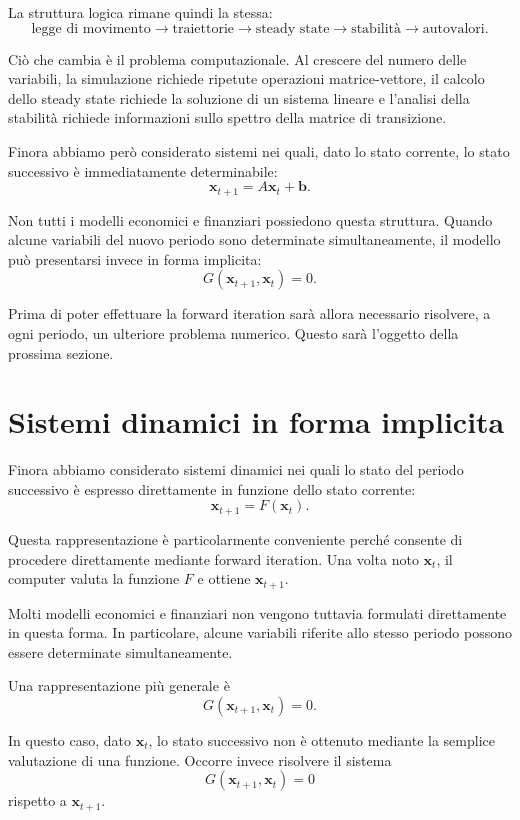 \documentclass{book}
\begin{document}
La struttura logica rimane quindi la stessa:
\[
\boxed{
\text{legge di movimento}
\longrightarrow
\text{traiettorie}
\longrightarrow
\text{steady state}
\longrightarrow
\text{stabilità}
\longrightarrow
\text{autovalori}
}.
\]

Ciò che cambia è il problema computazionale. Al crescere del numero delle
variabili, la simulazione richiede ripetute operazioni matrice-vettore,
il calcolo dello steady state richiede la soluzione di un sistema lineare
e l'analisi della stabilità richiede informazioni sullo spettro della
matrice di transizione.

Finora abbiamo però considerato sistemi nei quali, dato lo stato corrente,
lo stato successivo è immediatamente determinabile:
\[
\mathbf{x}_{t+1}
=
A\mathbf{x}_t+\mathbf{b}.
\]

Non tutti i modelli economici e finanziari possiedono questa struttura.
Quando alcune variabili del nuovo periodo sono determinate
simultaneamente, il modello può presentarsi invece in forma implicita:
\[
G(\mathbf{x}_{t+1},\mathbf{x}_t)=0.
\]

Prima di poter effettuare la forward iteration sarà allora necessario
risolvere, a ogni periodo, un ulteriore problema numerico. Questo sarà
l'oggetto della prossima sezione.

\section{Sistemi dinamici in forma implicita}

Finora abbiamo considerato sistemi dinamici nei quali lo stato del periodo
successivo è espresso direttamente in funzione dello stato corrente:
\[
\mathbf{x}_{t+1}=F(\mathbf{x}_t).
\]

Questa rappresentazione è particolarmente conveniente perché consente di
procedere direttamente mediante forward iteration. Una volta noto
$\mathbf{x}_t$, il computer valuta la funzione $F$ e ottiene
$\mathbf{x}_{t+1}$.

Molti modelli economici e finanziari non vengono tuttavia formulati
direttamente in questa forma. In particolare, alcune variabili riferite allo
stesso periodo possono essere determinate simultaneamente.

Una rappresentazione più generale è
\[
G(\mathbf{x}_{t+1},\mathbf{x}_t)=0.
\]

In questo caso, dato $\mathbf{x}_t$, lo stato successivo non è ottenuto
mediante la semplice valutazione di una funzione. Occorre invece risolvere
il sistema
\[
G(\mathbf{x}_{t+1},\mathbf{x}_t)=0
\]
rispetto a $\mathbf{x}_{t+1}$.
\end{document}
